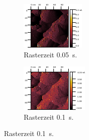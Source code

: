 \begin{figure}[H]
	\centering
	\begin{subfigure}{0.49\textwidth}
		\centering
\includegraphics[width=\textwidth]{../Gwyddion/Gold/TIME_005_I_forward.pdf}
\caption{Rasterzeit \SI{0.05}{s}.}

	\end{subfigure}
	\begin{subfigure}{0.49\textwidth}
		\centering
\includegraphics[width=\textwidth]{../Gwyddion/Gold/TIME_01_I_forward.pdf}
\caption{Rasterzeit \SI{0.1}{s}.}

	\end{subfigure}
	

\end{figure}
